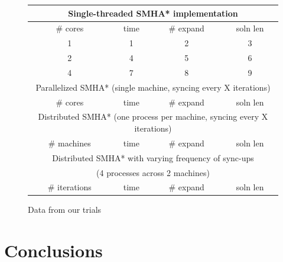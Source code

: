 \documentclass{article}
\begin{document}
\begin{figure}
\centering
\begin{tabular}{ c | c | c | c }
    \hline
    \multicolumn{4}{c}{Single-threaded SMHA* implementation} \\ \hline    
    \# cores & time & \# expand & soln len \\ \hline
    1 & 1 & 2 & 3 \\ \hline
    2 & 4 & 5 & 6 \\ \hline
    4 & 7 & 8 & 9 \\ \hline
    
     \multicolumn{4}{c}{Parallelized SMHA* (single machine, syncing every X iterations)} \\ \hline
    \# cores & time & \# expand & soln len \\ \hline
    
     \multicolumn{4}{c}{Distributed SMHA* (one process per machine, syncing every X iterations)} \\ \hline
    \# machines & time & \# expand & soln len \\ \hline
    
     \multicolumn{4}{c}{Distributed SMHA* with varying frequency of sync-ups} \\ \hline
     \multicolumn{4}{c}{(4 processes across 2 machines)} \\ \hline
    \# iterations & time & \# expand & soln len \\ \hline

    \hline
\end{tabular}
\caption{Data from our trials}
\label{fig:datatable}
\end{figure}



\section{Conclusions}

\end{document}
